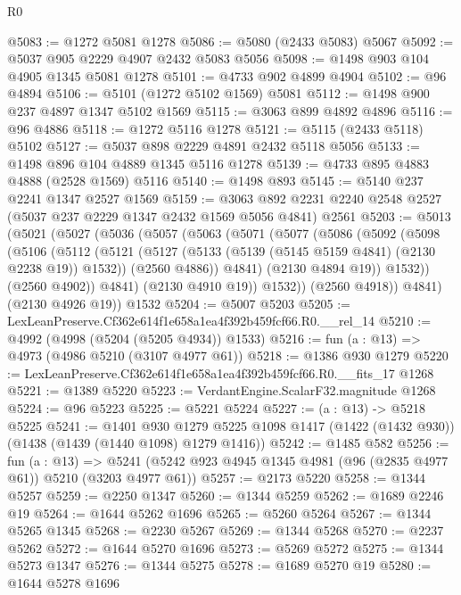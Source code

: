 \begin{lexlean}{R0}
\begin{coremodule}
@5083 := @1272 @5081 @1278
@5086 := @5080 (@2433 @5083) @5067
@5092 := @5037 @905 @2229 @4907 @2432 @5083 @5056
@5098 := @1498 @903 @104 @4905 @1345 @5081 @1278
@5101 := @4733 @902 @4899 @4904
@5102 := @96 @4894
@5106 := @5101 (@1272 @5102 @1569) @5081
@5112 := @1498 @900 @237 @4897 @1347 @5102 @1569
@5115 := @3063 @899 @4892 @4896
@5116 := @96 @4886
@5118 := @1272 @5116 @1278
@5121 := @5115 (@2433 @5118) @5102
@5127 := @5037 @898 @2229 @4891 @2432 @5118 @5056
@5133 := @1498 @896 @104 @4889 @1345 @5116 @1278
@5139 := @4733 @895 @4883 @4888 (@2528 @1569) @5116
@5140 := @1498 @893
@5145 := @5140 @237 @2241 @1347 @2527 @1569
@5159 := @3063 @892 @2231 @2240 @2548 @2527 (@5037 @237 @2229 @1347 @2432 @1569 @5056 @4841) @2561
@5203 := @5013
    (@5021
      (@5027
        (@5036
          (@5057
            (@5063
              (@5071
                (@5077
                  (@5086
                    (@5092
                      (@5098
                        (@5106
                          (@5112
                            (@5121
                              (@5127 (@5133 (@5139 (@5145 @5159 @4841) (@2130 @2238 @19)) @1532))
                              (@2560 @4886))
                            @4841)
                          (@2130 @4894 @19))
                        @1532))
                    (@2560 @4902))
                  @4841)
                (@2130 @4910 @19))
              @1532))
          (@2560 @4918))
        @4841)
      (@2130 @4926 @19))
    @1532
@5204 := @5007 @5203
@5205 := LexLeanPreserve.Cf362e614f1e658a1ea4f392b459fcf66.R0.__rel_14
@5210 := @4992 (@4998 (@5204 (@5205 @4934)) @1533)
@5216 := fun (a : @13) => @4973 (@4986 @5210 (@3107 @4977 @61))
@5218 := @1386 @930 @1279
@5220 := LexLeanPreserve.Cf362e614f1e658a1ea4f392b459fcf66.R0.__fits_17 @1268
@5221 := @1389 @5220
@5223 := VerdantEngine.ScalarF32.magnitude @1268
@5224 := @96 @5223
@5225 := @5221 @5224
@5227 := (a : @13) -> @5218 @5225
@5241 := @1401
    @930
    @1279
    @5225
    @1098
    @1417
    (@1422 (@1432 @930))
    (@1438 (@1439 (@1440 @1098) @1279 @1416))
@5242 := @1485 @582
@5256 := fun (a : @13) =>
  @5241 (@5242 @923 @4945 @1345 @4981 (@96 (@2835 @4977 @61)) @5210 (@3203 @4977 @61))
@5257 := @2173 @5220
@5258 := @1344 @5257
@5259 := @2250 @1347
@5260 := @1344 @5259
@5262 := @1689 @2246 @19
@5264 := @1644 @5262 @1696
@5265 := @5260 @5264
@5267 := @1344 @5265 @1345
@5268 := @2230 @5267
@5269 := @1344 @5268
@5270 := @2237 @5262
@5272 := @1644 @5270 @1696
@5273 := @5269 @5272
@5275 := @1344 @5273 @1347
@5276 := @1344 @5275
@5278 := @1689 @5270 @19
@5280 := @1644 @5278 @1696

\end{coremodule}
\end{lexlean}

